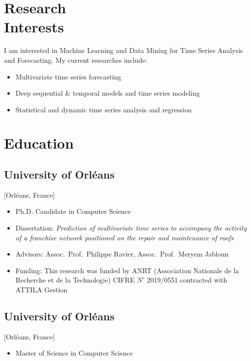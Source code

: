 \documentclass{mycv}
\begin{document}
\maketitle

\section{Research \\ Interests}

I am interested in Machine Learning and Data Mining for Time Series Analysis and Forecasting. My current researches include:

\begin{itemize}
  \item Multivariate time series forecasting
  \item Deep sequential \& temporal models and time series modeling
  \item Statistical and dynamic time series analysis and regression
\end{itemize}

\section{Education}

\subsection{University of Orl\'eans}[Orl\'eans, France]
\begin{itemize}[label={}]
  \item Ph.D. Candidate in Computer Science 
  \item Dissertation: \textit{Prediction of multivariate time series to accompany the activity of a franchise network positioned on the repair and maintenance of roofs}
  \item Advisors: Assoc.~Prof.~Philippe Ravier, Assoc.~Prof.~Meryem Jabloun
  \item Funding: This research was funded by ANRT (Association Nationale de la Recherche et de la Technologie) CIFRE $N^{\circ}$ 2019/0551 contracted with ATTILA Gestion
\end{itemize}

\subsection{University of Orl\'eans}[Orl\'eans, France]
\begin{itemize}[label={}]
  \item Master of Science in Computer Science 
\end{itemize}
\end{document}
